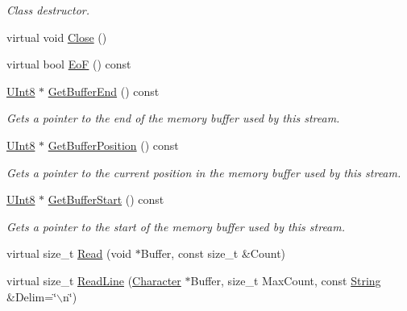 \begin{DoxyCompactItemize}
\begin{DoxyCompactList}\small\item\em Class destructor. \item\end{DoxyCompactList}\item 
virtual void \hyperlink{classMezzanine_1_1Resource_1_1MemoryDataStream_a78b5d296a5c483cd9a1b15e3c5b0ef28}{Close} ()
\item 
virtual bool \hyperlink{classMezzanine_1_1Resource_1_1MemoryDataStream_a42397450c2f66c07e21bc4aed30c323f}{EoF} () const 
\item 
\hyperlink{namespaceMezzanine_aa5f38583d9025e05fa33d6e32e97b457}{UInt8} $\ast$ \hyperlink{classMezzanine_1_1Resource_1_1MemoryDataStream_a10bc659bb3deb8ace7f4fa11b26567f6}{GetBufferEnd} () const 
\begin{DoxyCompactList}\small\item\em Gets a pointer to the end of the memory buffer used by this stream. \item\end{DoxyCompactList}\item 
\hyperlink{namespaceMezzanine_aa5f38583d9025e05fa33d6e32e97b457}{UInt8} $\ast$ \hyperlink{classMezzanine_1_1Resource_1_1MemoryDataStream_a1e18cd84d11385321f1cf9dd03dc6519}{GetBufferPosition} () const 
\begin{DoxyCompactList}\small\item\em Gets a pointer to the current position in the memory buffer used by this stream. \item\end{DoxyCompactList}\item 
\hyperlink{namespaceMezzanine_aa5f38583d9025e05fa33d6e32e97b457}{UInt8} $\ast$ \hyperlink{classMezzanine_1_1Resource_1_1MemoryDataStream_a3fde0e9b62586a1380bab2a227dd756a}{GetBufferStart} () const 
\begin{DoxyCompactList}\small\item\em Gets a pointer to the start of the memory buffer used by this stream. \item\end{DoxyCompactList}\item 
virtual size\_\-t \hyperlink{classMezzanine_1_1Resource_1_1MemoryDataStream_a3b054bb40739588b40b6b04e92c31621}{Read} (void $\ast$Buffer, const size\_\-t \&Count)
\item 
virtual size\_\-t \hyperlink{classMezzanine_1_1Resource_1_1MemoryDataStream_aee8d813b5f3d2596fde2bd45a7882ae0}{ReadLine} (\hyperlink{namespaceMezzanine_ad5147a419db7627ee552a2b582f1052d}{Character} $\ast$Buffer, size\_\-t MaxCount, const \hyperlink{namespaceMezzanine_acf9fcc130e6ebf08e3d8491aebcf1c86}{String} \&Delim=\char`\"{}$\backslash$n\char`\"{})

\end{DoxyCompactItemize}
